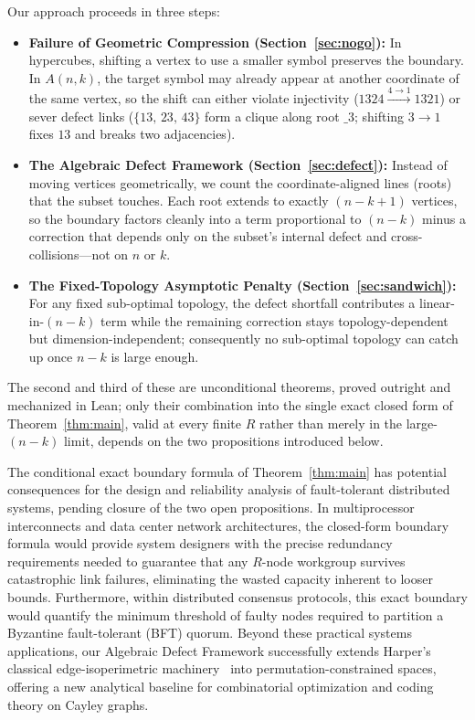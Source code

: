 Our approach proceeds in three steps:
\begin{itemize}
\item \textbf{Failure of Geometric Compression (Section~\ref{sec:nogo}):} In
hypercubes, shifting a vertex to use a smaller symbol preserves the boundary. In
$A(n,k)$, the target symbol may already appear at another coordinate of the same
vertex, so the shift can either violate injectivity ($1324 \xrightarrow{4\to 1}
1321$) or sever defect links ($\{13,\,23,\,43\}$ form a clique along root $\_3$;
shifting $3\!\to\!1$ fixes $13$ and breaks two adjacencies).
\item \textbf{The Algebraic Defect Framework (Section~\ref{sec:defect}):}
Instead of moving vertices geometrically, we count the coordinate-aligned lines
(roots) that the subset touches. Each root extends to exactly $(n-k+1)$
vertices, so the boundary factors cleanly into a term proportional to $(n-k)$
minus a correction that depends only on the subset's internal defect and
cross-collisions---not on $n$ or $k$.
\item \textbf{The Fixed-Topology Asymptotic Penalty
(Section~\ref{sec:sandwich}):} For any fixed sub-optimal topology, the defect
shortfall contributes a linear-in-$(n-k)$ term while the remaining correction
stays topology-dependent but dimension-independent; consequently no sub-optimal
topology can catch up once $n-k$ is large enough.
\end{itemize}
The second and third of these are unconditional theorems, proved outright and
mechanized in Lean; only their combination into the single exact closed form of
Theorem~\ref{thm:main}, valid at every finite $R$ rather than merely in the
large-$(n-k)$ limit, depends on the two propositions introduced below.

The conditional exact boundary formula of Theorem~\ref{thm:main} has potential
consequences for the design and reliability analysis of fault-tolerant
distributed systems, pending closure of the two open propositions. In
multiprocessor interconnects and data center network architectures, the
closed-form boundary formula would provide system designers with the precise
redundancy requirements needed to guarantee that any $R$-node workgroup survives
catastrophic link failures, eliminating the wasted capacity inherent to looser
bounds. Furthermore, within distributed consensus protocols, this exact boundary
would quantify the minimum threshold of faulty nodes required to partition a
Byzantine fault-tolerant (BFT) quorum. Beyond these practical systems
applications, our Algebraic Defect Framework successfully extends Harper's
classical edge-isoperimetric machinery~\cite{harper1966optimal} into
permutation-constrained spaces, offering a new analytical baseline for
combinatorial optimization and coding theory on Cayley graphs.
